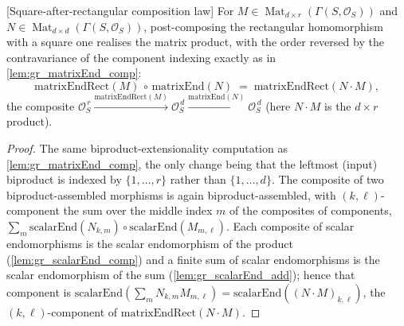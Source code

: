 \begin{lemma}

[Square-after-rectangular composition law]
  \label{lem:gr_matrixEndRect_comp}
  For \(M \in \operatorname{Mat}_{d\times r}(\Gamma(S,\mathcal{O}_S))\) and
  \(N \in \operatorname{Mat}_{d\times d}(\Gamma(S,\mathcal{O}_S))\), post-composing the
  rectangular homomorphism with a square one realises the matrix product, with the order
  reversed by the contravariance of the component indexing exactly as in
  \cref{lem:gr_matrixEnd_comp}:
  \[
    \mathrm{matrixEndRect}(M) \,\circ\, \mathrm{matrixEnd}(N)
      \;=\; \mathrm{matrixEndRect}(N \cdot M),
  \]
  the composite \(\mathcal{O}_S^{\,r} \xrightarrow{\mathrm{matrixEndRect}(M)}
  \mathcal{O}_S^{\,d} \xrightarrow{\mathrm{matrixEnd}(N)} \mathcal{O}_S^{\,d}\) (here
  \(N \cdot M\) is the \(d \times r\) product).
\end{lemma}
\begin{proof}
  The same biproduct-extensionality computation as \cref{lem:gr_matrixEnd_comp}, the only
  change being that the leftmost (input) biproduct is indexed by \(\{1,\dots,r\}\) rather
  than \(\{1,\dots,d\}\). The composite of two biproduct-assembled morphisms is again
  biproduct-assembled, with \((k,\ell)\)-component the sum over the middle index \(m\) of the
  composites of components, \(\sum_m \mathrm{scalarEnd}(N_{k,m}) \circ
  \mathrm{scalarEnd}(M_{m,\ell})\). Each composite of scalar endomorphisms is the scalar
  endomorphism of the product (\cref{lem:gr_scalarEnd_comp}) and a finite sum of scalar
  endomorphisms is the scalar endomorphism of the sum (\cref{lem:gr_scalarEnd_add}); hence
  that component is \(\mathrm{scalarEnd}(\sum_m N_{k,m} M_{m,\ell}) =
  \mathrm{scalarEnd}((N\cdot M)_{k,\ell})\), the \((k,\ell)\)-component of
  \(\mathrm{matrixEndRect}(N\cdot M)\).
\end{proof}

